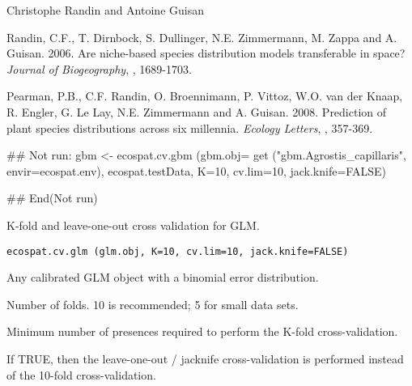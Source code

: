 \documentclass[a4paper]{book}
\begin{document}
%
\begin{Author}\relax
Christophe Randin  and Antoine Guisan 
\end{Author}
%
\begin{References}\relax
Randin, C.F., T. Dirnbock, S. Dullinger, N.E. Zimmermann, M. Zappa and A. Guisan. 2006. Are niche-based species distribution models transferable in space? \emph{Journal of Biogeography}, , 1689-1703.


Pearman, P.B., C.F. Randin, O. Broennimann, P. Vittoz, W.O. van der Knaap, R. Engler, G. Le Lay, N.E. Zimmermann and A. Guisan. 2008. Prediction of plant species distributions across six millennia. \emph{Ecology Letters}, , 357-369.
\end{References}
%
\begin{Examples}
\begin{ExampleCode}
## Not run: 
gbm <- ecospat.cv.gbm (gbm.obj= get ("gbm.Agrostis_capillaris", envir=ecospat.env), 
ecospat.testData, K=10, cv.lim=10, jack.knife=FALSE)

## End(Not run)
\end{ExampleCode}
\end{Examples}
%
\begin{Description}\relax
K-fold and leave-one-out cross validation for GLM.
\end{Description}
%
\begin{Usage}
\begin{verbatim}
ecospat.cv.glm (glm.obj, K=10, cv.lim=10, jack.knife=FALSE)
\end{verbatim}
\end{Usage}
%
\begin{Arguments}
\begin{ldescription}
\item[\code{glm.obj}] Any calibrated GLM object with a binomial error distribution.
\item[\code{K}] Number of folds. 10 is recommended; 5 for small data sets.
\item[\code{cv.lim}] Minimum number of presences required to perform the K-fold cross-validation.
\item[\code{jack.knife}] If TRUE, then the leave-one-out / jacknife cross-validation is performed instead of the 10-fold cross-validation.
\end{ldescription}
\end{Arguments}
\end{document}
